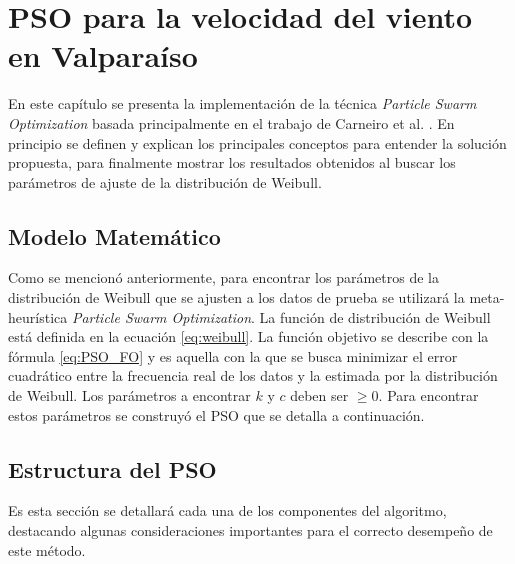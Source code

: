 
\chapter{PSO para la velocidad del viento en Valparaíso}
En este capítulo se presenta la implementación de la técnica \emph{Particle Swarm Optimization} basada principalmente en el trabajo de Carneiro et al. \cite{Carneiro15}. En principio se definen y explican los principales conceptos para entender la solución propuesta, para finalmente mostrar los resultados obtenidos al buscar los parámetros de ajuste de la distribución de Weibull.

\section{Modelo Matemático} \label{ss:Modelo_Mat}
Como se mencionó anteriormente, para encontrar los parámetros de la distribución de Weibull que se ajusten a los datos de prueba se utilizará la meta-heurística \emph{Particle Swarm Optimization}. La función de distribución de Weibull está definida en la ecuación \ref{eq:weibull}. La función objetivo se describe con la fórmula \ref{eq:PSO_FO} y es aquella con la que se busca minimizar el error cuadrático entre la frecuencia real de los datos y la estimada por la distribución de Weibull. Los parámetros a encontrar $k$ y $c$ deben ser $\geq 0$. Para encontrar estos parámetros se construyó el PSO que se detalla a continuación.

\section{Estructura del PSO}
Es esta sección se detallará cada una de los componentes del algoritmo, destacando algunas consideraciones importantes para el correcto desempeño de este método.
